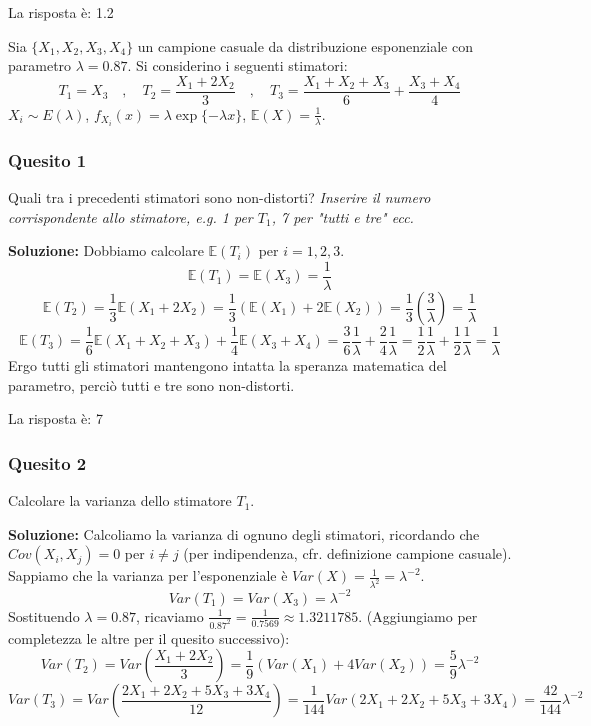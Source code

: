 \documentclass[12pt, a4paper]{article}
\begin{document}
La risposta è: 1.2

\newpage

\vspace{0.5cm}
\begin{tcolorbox}[colback=lightergray!10, colframe=tocsec, title=\textbf{Esercizio 14}]
Sia $\{X_1, X_2, X_3, X_4\}$ un campione casuale da distribuzione esponenziale con parametro $\lambda=0.87$.
Si considerino i seguenti stimatori:
$$ T_1 = X_3 \quad , \quad T_2 = \frac{X_1 + 2X_2}{3} \quad , \quad T_3 = \frac{X_1 + X_2 + X_3}{6} + \frac{X_3 + X_4}{4} $$
$X_i \sim E(\lambda)$, $f_{X_i}(x) = \lambda\exp\{-\lambda x\}$, $\mathbb{E}(X) = \frac{1}{\lambda}$.
\end{tcolorbox}

\subsubsection*{Quesito 1}
Quali tra i precedenti stimatori sono non-distorti?
\textit{Inserire il numero corrispondente allo stimatore, e.g. 1 per $T_1$, 7 per "tutti e tre" ecc.}

\textbf{Soluzione:}
Dobbiamo calcolare $\mathbb{E}(T_i)$ per $i=1,2,3$.
$$ \mathbb{E}(T_1) = \mathbb{E}(X_3) = \frac{1}{\lambda} $$
$$ \mathbb{E}(T_2) = \frac{1}{3} \mathbb{E}(X_1 + 2X_2) = \frac{1}{3} (\mathbb{E}(X_1) + 2\mathbb{E}(X_2)) = \frac{1}{3}\left(\frac{3}{\lambda}\right) = \frac{1}{\lambda} $$
$$ \mathbb{E}(T_3) = \frac{1}{6} \mathbb{E}(X_1 + X_2 + X_3) + \frac{1}{4} \mathbb{E}(X_3 + X_4) = \frac{3}{6} \frac{1}{\lambda} + \frac{2}{4} \frac{1}{\lambda} = \frac{1}{2}\frac{1}{\lambda} + \frac{1}{2}\frac{1}{\lambda} = \frac{1}{\lambda} $$
Ergo tutti gli stimatori mantengono intatta la speranza matematica del parametro, perciò tutti e tre sono non-distorti.

La risposta è: 7

\subsubsection*{Quesito 2}
Calcolare la varianza dello stimatore $T_1$.

\textbf{Soluzione:}
Calcoliamo la varianza di ognuno degli stimatori, ricordando che $Cov(X_i, X_j) = 0$ per $i \neq j$ (per indipendenza, cfr. definizione campione casuale). Sappiamo che la varianza per l'esponenziale è $Var(X) = \frac{1}{\lambda^2} = \lambda^{-2}$.
$$ Var(T_1) = Var(X_3) = \lambda^{-2} $$
Sostituendo $\lambda=0.87$, ricaviamo $\frac{1}{0.87^2} = \frac{1}{0.7569} \approx 1.3211785$.
(Aggiungiamo per completezza le altre per il quesito successivo):
$$ Var(T_2) = Var\left(\frac{X_1 + 2X_2}{3}\right) = \frac{1}{9} (Var(X_1) + 4Var(X_2)) = \frac{5}{9} \lambda^{-2} $$
$$ Var(T_3) = Var\left(\frac{2X_1 + 2X_2 + 5X_3 + 3X_4}{12}\right) = \frac{1}{144} Var(2X_1 + 2X_2 + 5X_3 + 3X_4) = \frac{42}{144} \lambda^{-2} $$
\end{document}
